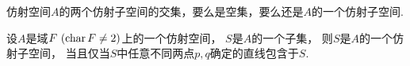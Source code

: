 \begin{proposition}
仿射空间\(A\)的两个仿射子空间的交集，要么是空集，要么还是\(A\)的一个仿射子空间.
\end{proposition}

\begin{theorem}
设\(A\)是域\(F\ (\operatorname{char} F\neq2)\)上的一个仿射空间，
\(S\)是\(A\)的一个子集，
则\(S\)是\(A\)的一个仿射子空间，
当且仅当\(S\)中任意不同两点\(p,q\)确定的直线包含于\(S\).
\end{theorem}

